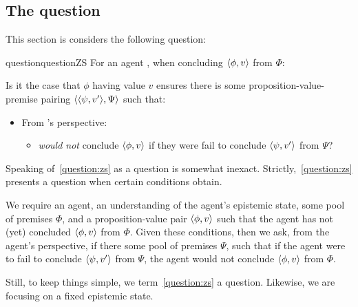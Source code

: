 \subsection{The question}
\label{sec:ZS:question}

\begin{note}
  This section is considers the following question:

  \begin{restatable}{question}{questionZS}
    \label{question:zs}
    For an agent \vAgent{}, when concluding \(\langle \phi, v \rangle\) from \(\Phi\):

    Is it the case that \(\phi\) having value \(v\) ensures there is some proposition-value-premise pairing \(\langle \langle \psi, v' \rangle, \Psi \rangle\) such that:
    \begin{itemize}
    \item From \vAgent{}'s perspective:
      \begin{itemize}
      \item \vAgent{} \emph{would not} conclude \(\langle \phi, v \rangle\) if they were fail to conclude \(\langle \psi, v' \rangle\) from \(\Psi\)?
      \end{itemize}
    \end{itemize}
    \vspace{-\baselineskip}
  \end{restatable}

  Speaking of~\autoref{question:zs} as a question is somewhat inexact.
  Strictly,~\autoref{question:zs} presents a question when certain conditions obtain.

  We require an agent, an understanding of the agent's epistemic state, some pool of premises \(\Phi\), and a proposition-value pair \(\langle \phi, v \rangle\) such that the agent has not (yet) concluded \(\langle \phi, v \rangle\) from \(\Phi\).
  Given these conditions, then we ask, from the agent's perspective, if there some pool of premises \(\Psi\), such that if the agent were to fail to conclude \(\langle \psi, v' \rangle\) from \(\Psi\), the agent would not conclude \(\langle \phi, v \rangle\) from \(\Phi\).

  Still, to keep things simple, we term~\autoref{question:zs} a question.
  Likewise, we are focusing on a fixed epistemic state.
\end{note}

